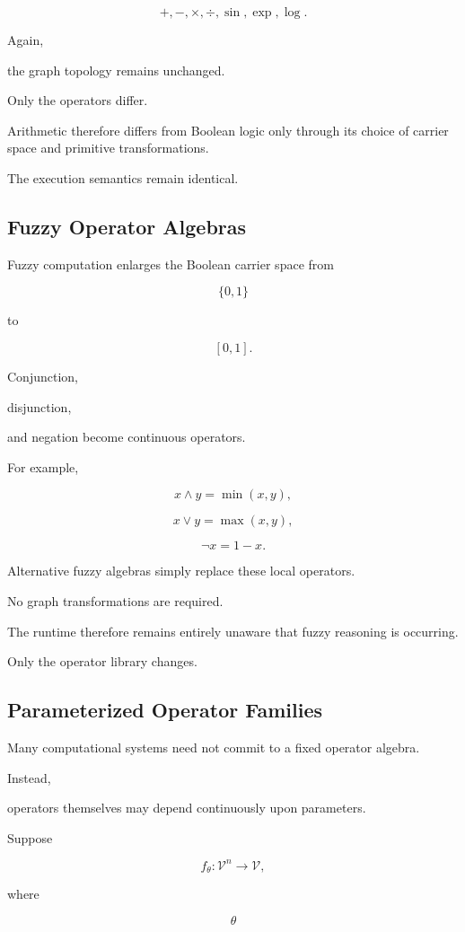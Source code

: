 \documentclass[12pt,oneside]{article}
\begin{document}
\[
+,
-,
\times,
\div,
\sin,
\exp,
\log.
\]

Again,

the graph topology remains unchanged.

Only the operators differ.

Arithmetic therefore differs from Boolean logic only through its choice of carrier space and primitive transformations.

The execution semantics remain identical.

\subsection{Fuzzy Operator Algebras}

Fuzzy computation enlarges the Boolean carrier space from

\[
\{0,1\}
\]

to

\[
[0,1].
\]

Conjunction,

disjunction,

and negation become continuous operators.

For example,

\[
x\wedge y
=
\min(x,y),
\]

\[
x\vee y
=
\max(x,y),
\]

\[
\neg x
=
1-x.
\]

Alternative fuzzy algebras simply replace these local operators.

No graph transformations are required.

The runtime therefore remains entirely unaware that fuzzy reasoning is occurring.

Only the operator library changes.

\subsection{Parameterized Operator Families}

Many computational systems need not commit to a fixed operator algebra.

Instead,

operators themselves may depend continuously upon parameters.

Suppose

\[
f_\theta
:
\mathcal V^n
\rightarrow
\mathcal V,
\]

where

\[
\theta
\]
\end{document}
